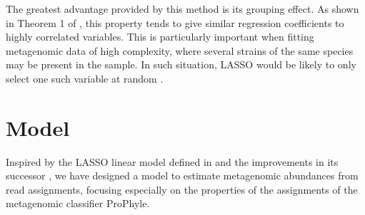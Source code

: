 The greatest advantage provided by this method is its grouping effect. As shown in Theorem 1 of \cite{zou_regularization_2005}, this property tends to give similar regression coefficients to highly correlated variables. This is particularly important when fitting metagenomic data of high complexity, where several strains of the same species may be present in the sample. In such situation, LASSO would be likely to only select one such variable at random \cite{zou_regularization_2005}.



\section{Model}

Inspired by the LASSO linear model defined in \cite{lindner_metagenomic_2013} and the improvements in its successor \cite{fischer_abundance_2017}, we have designed a model to estimate metagenomic abundances from read assignments, focusing especially on the properties of the assignments of the metagenomic classifier ProPhyle.

